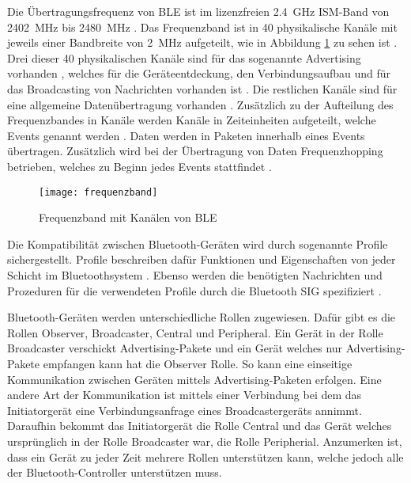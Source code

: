 Die Übertragungsfrequenz von \ac{BLE} ist im lizenzfreien 2.4~GHz \acf{ISM}-Band von 2402~MHz bis 2480~MHz \cites[S.~4]{siliconBLE}[S.~190]{bluetoothCore}. Das Frequenzband ist in 40 physikalische Kanäle mit jeweils einer Bandbreite von 2~MHz aufgeteilt, wie in Abbildung \ref{fig:frequenzbandBLE} zu sehen ist \cite[S.~190]{bluetoothCore}. Drei dieser 40 physikalischen Kanäle sind für das sogenannte Advertising vorhanden \cite[S.~190]{bluetoothCore}, welches für die Geräteentdeckung, den Verbindungsaufbau und für das Broadcasting von Nachrichten vorhanden ist \cite[S.~4]{siliconBLE}. Die restlichen Kanäle sind für eine allgemeine Datenübertragung vorhanden \cite[S.~190]{bluetoothCore}. Zusätzlich zu der Aufteilung des Frequenzbandes in Kanäle werden Kanäle in Zeiteinheiten aufgeteilt, welche Events genannt werden \cite[S.~190]{bluetoothCore}. Daten werden in Paketen innerhalb eines Events übertragen. Zusätzlich wird bei der Übertragung von Daten Frequenzhopping betrieben, welches zu Beginn jedes Events stattfindet \cite[S.~190f.]{bluetoothCore}. 

\begin{figure}[h]
\centering
\texttt{[image: frequenzband]}
\caption{Frequenzband mit Kanälen von \ac{BLE} \cite[S.~4]{siliconBLE}}
\label{fig:frequenzbandBLE}
\end{figure}

Die Kompatibilität zwischen Bluetooth-Geräten wird durch sogenannte Profile sichergestellt. Profile beschreiben dafür Funktionen und Eigenschaften von jeder Schicht im Bluetoothsystem \cite[S.~277]{bluetoothCore}. Ebenso werden die benötigten Nachrichten und Prozeduren für die verwendeten Profile durch die Bluetooth \ac{SIG} spezifiziert \cite[S.~1241]{bluetoothCore}.

Bluetooth-Geräten werden unterschiedliche Rollen zugewiesen. Dafür gibt es die Rollen Observer, Broadcaster, Central und Peripheral. Ein Gerät in der Rolle Broadcaster verschickt Advertising-Pakete und ein Gerät welches nur Advertising-Pakete empfangen kann hat die Observer Rolle. So kann eine einseitige Kommunikation zwischen Geräten mittels Advertising-Paketen erfolgen. Eine andere Art der Kommunikation ist mittels einer Verbindung bei dem das Initiatorgerät eine Verbindungsanfrage eines Broadcastergeräts annimmt. Daraufhin bekommt das Initiatorgerät die Rolle Central und das Gerät welches ursprünglich in der Rolle Broadcaster war, die Rolle Peripherial. Anzumerken ist, dass ein Gerät zu jeder Zeit mehrere Rollen unterstützen kann, welche jedoch alle der Bluetooth-Controller unterstützen muss. \cite[S.~190f., S.~278, S.~1246ff.]{bluetoothCore}

